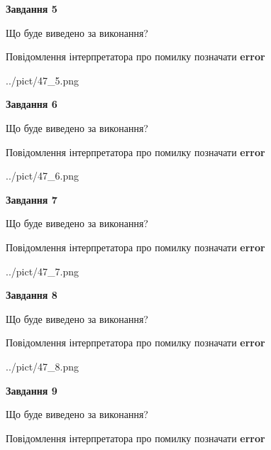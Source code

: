\documentclass[11pt, ukrainian]{article}
\begin{document}
{\begin {large}
{\begin {center}\textbf{Завдання 5}\end {center}}\par
Що буде виведено за виконання? \par
Повідомлення інтерпретатора про помилку позначати \textbf{error}

\begin{center}
	{../pict/47_5.png}
\end{center}
\newpage

{\begin {center}\textbf{Завдання 6}\end {center}}\par
Що буде виведено за виконання? \par
Повідомлення інтерпретатора про помилку позначати \textbf{error}

\begin{center}
	{../pict/47_6.png}
\end{center}
\newpage

{\begin {center}\textbf{Завдання 7}\end {center}}\par
Що буде виведено за виконання? \par
Повідомлення інтерпретатора про помилку позначати \textbf{error}

\begin{center}
	{../pict/47_7.png}
\end{center}
\newpage

{\begin {center}\textbf{Завдання 8}\end {center}}\par
Що буде виведено за виконання? \par
Повідомлення інтерпретатора про помилку позначати \textbf{error}

\begin{center}
	{../pict/47_8.png}
\end{center}
\newpage

{\begin {center}\textbf{Завдання 9}\end {center}}\par
Що буде виведено за виконання? \par
Повідомлення інтерпретатора про помилку позначати \textbf{error}


\end{large}}
\end{document}

